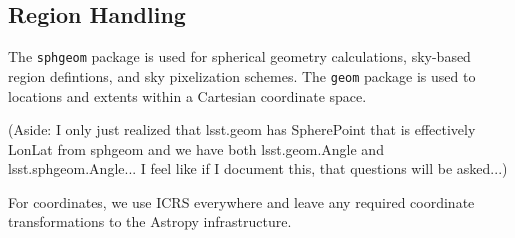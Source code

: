 \subsection{Region Handling}

The \texttt{sphgeom} package is used for spherical geometry calculations, sky-based region defintions, and sky pixelization schemes.
The \texttt{geom} package is used to locations and extents within a Cartesian coordinate space.

(Aside: I only just realized that lsst.geom has SpherePoint that is effectively LonLat from sphgeom and we have both lsst.geom.Angle and lsst.sphgeom.Angle... I feel like if I document this, that questions will be asked...)

For coordinates, we use ICRS everywhere and leave any required coordinate transformations to the Astropy infrastructure.
